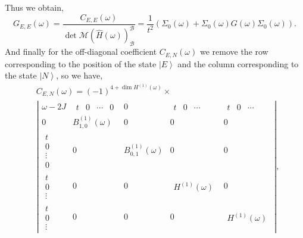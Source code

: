 \documentclass{article}
\newcommand{\ket}[1]{\left\vert #1 \right\rangle}
\begin{document}
Thus we obtain,
\begin{equation}
    G_{E,E}(\omega) = \frac{C_{E,E}(\omega)}{\det \mathcal{M}(\hat{H}(\omega))_\mathcal{B}^\mathcal{B}} = 
    \frac{1}{t^2}\left(\Sigma_0(\omega) + \Sigma_0(\omega)G(\omega)\Sigma_0(\omega)\right).
\end{equation}
And finally for the off-diagonal coefficient $C_{E,N}(\omega)$ we remove the row corresponding to the position of the state $\ket{E}$ and the column corresponding to the state $\ket{N}$, so we have,
\begin{equation}
\begin{split}
    &C_{E,N}(\omega) = (-1)^{4 + \dim H^{(1)}(\omega)} \times \\ 
    &\left\vert
    \begin{array}{c|c|c|c|c}
        \omega - 2J & 
            \begin{array}{cccc} t & 0 & \cdots & 0 \end{array} & 
            0 &
            \begin{array}{ccc} t & 0 & \cdots \end{array} &
            \begin{array}{ccc} t & 0 & \cdots \end{array} \\
        \hline
        0 & B^{(1)}_{1,0}(\omega) & 0 & 0 & 0 \\
        \hline
        \begin{array}{c} t \\ 0 \\ \vdots \\ 0 \end{array} & 
            0 & B^{(1)}_{0,1}(\omega) & 0 & 0 \\
        \hline
        \begin{array}{c} t \\ 0 \\ \vdots \end{array} & 
            0 & 0 &\begin{array}{c} H^{(1)}(\omega) \end{array} & 0 \\
        \hline
        \begin{array}{c} t \\ 0 \\ \vdots \end{array} & 
            0 & 0 & 0 & \begin{array}{c} H^{(1)}(\omega) \end{array}
    \end{array}
    \right\vert,
\end{split}
\end{equation}
\end{document}
